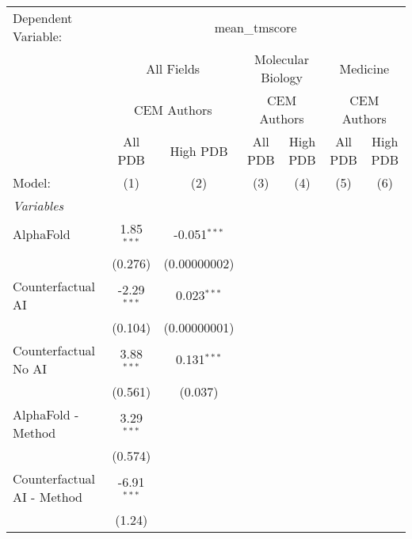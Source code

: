 \begingroup
\centering
\begin{tabular}{lcccccc}
   \tabularnewline \midrule \midrule
   Dependent Variable: & \multicolumn{6}{c}{mean\_tmscore}\\
 & \multicolumn{2}{c}{All Fields} & \multicolumn{2}{c}{Molecular Biology} & \multicolumn{2}{c}{Medicine} \\
\cmidrule(lr){2-3} \cmidrule(lr){4-5} \cmidrule(lr){6-7}
 & \multicolumn{2}{c}{CEM Authors} & \multicolumn{2}{c}{CEM Authors} & \multicolumn{2}{c}{CEM Authors} \\
\cmidrule(lr){2-3} \cmidrule(lr){4-5} \cmidrule(lr){6-7}
 & \multicolumn{1}{c}{All PDB} & \multicolumn{1}{c}{High PDB} & \multicolumn{1}{c}{All PDB} & \multicolumn{1}{c}{High PDB} & \multicolumn{1}{c}{All PDB} & \multicolumn{1}{c}{High PDB} \\
\cmidrule(lr){2-2} \cmidrule(lr){3-3} \cmidrule(lr){4-4} \cmidrule(lr){5-5} \cmidrule(lr){6-6} \cmidrule(lr){7-7}
   Model:                                & (1)           & (2)            & (3) & (4) & (5) & (6)\\  
   \midrule
   \emph{Variables}\\
   AlphaFold                             & 1.85$^{***}$  & -0.051$^{***}$ &     &     &     &   \\   
                                         & (0.276)       & (0.00000002)   &     &     &     &   \\   
   Counterfactual AI                     & -2.29$^{***}$ & 0.023$^{***}$  &     &     &     &   \\   
                                         & (0.104)       & (0.00000001)   &     &     &     &   \\   
   Counterfactual No AI                  & 3.88$^{***}$  & 0.131$^{***}$  &     &     &     &   \\   
                                         & (0.561)       & (0.037)        &     &     &     &   \\   
   AlphaFold - Method                    & 3.29$^{***}$  &                &     &     &     &   \\   
                                         & (0.574)       &                &     &     &     &   \\   
   Counterfactual AI - Method            & -6.91$^{***}$ &                &     &     &     &   \\   
                                         & (1.24)        &                &     &     &     &   \\   

\end{tabular}
